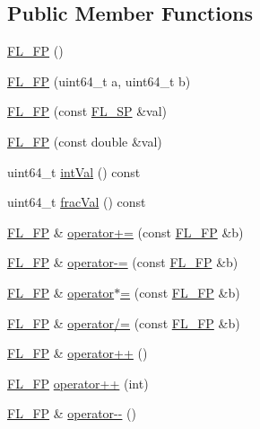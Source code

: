 \subsection*{Public Member Functions}
\begin{DoxyCompactItemize}
\item 
\hyperlink{class_f_l___f_p_a2db44ca3f010e72af1a0ba97f443fe93}{F\+L\+\_\+\+FP} ()
\item 
\hyperlink{class_f_l___f_p_ac233226f5a38c1180b00965cda0b2ba1}{F\+L\+\_\+\+FP} (uint64\+\_\+t a, uint64\+\_\+t b)
\item 
\hyperlink{class_f_l___f_p_ae69dbbbcee3563f7ff4e3102dd137c05}{F\+L\+\_\+\+FP} (const \hyperlink{struct_f_l___s_p}{F\+L\+\_\+\+SP} \&val)
\item 
\hyperlink{class_f_l___f_p_a552b545bb667d5a6436e89f33586e9fa}{F\+L\+\_\+\+FP} (const double \&val)
\item 
uint64\+\_\+t \hyperlink{class_f_l___f_p_acffd4f751e5042dbed4a28bfe3f90ea5}{int\+Val} () const
\item 
uint64\+\_\+t \hyperlink{class_f_l___f_p_adeac9cc0d327d4759ac35890c13978c0}{frac\+Val} () const
\item 
\hyperlink{class_f_l___f_p}{F\+L\+\_\+\+FP} \& \hyperlink{class_f_l___f_p_ab07d8c341752a6668a3a8a6e0d8ba2c7}{operator+=} (const \hyperlink{class_f_l___f_p}{F\+L\+\_\+\+FP} \&b)
\item 
\hyperlink{class_f_l___f_p}{F\+L\+\_\+\+FP} \& \hyperlink{class_f_l___f_p_a494e954f36fbfd791dfc2117e0de4baa}{operator-\/=} (const \hyperlink{class_f_l___f_p}{F\+L\+\_\+\+FP} \&b)
\item 
\hyperlink{class_f_l___f_p}{F\+L\+\_\+\+FP} \& \hyperlink{class_f_l___f_p_a04123cec30a145c37cfdaa2030ecba5e}{operator$\ast$=} (const \hyperlink{class_f_l___f_p}{F\+L\+\_\+\+FP} \&b)
\item 
\hyperlink{class_f_l___f_p}{F\+L\+\_\+\+FP} \& \hyperlink{class_f_l___f_p_a2bbae2b6138642ae4cf90eb7b3a1ea5f}{operator/=} (const \hyperlink{class_f_l___f_p}{F\+L\+\_\+\+FP} \&b)
\item 
\hyperlink{class_f_l___f_p}{F\+L\+\_\+\+FP} \& \hyperlink{class_f_l___f_p_a883f8d6a0d34a3af9a35654b25f0ba7c}{operator++} ()
\item 
\hyperlink{class_f_l___f_p}{F\+L\+\_\+\+FP} \hyperlink{class_f_l___f_p_a2feeebae2b863b1955232473b4f62db0}{operator++} (int)
\item 
\hyperlink{class_f_l___f_p}{F\+L\+\_\+\+FP} \& \hyperlink{class_f_l___f_p_a3e9f6cc369b21fe2d188ebeca60a3df4}{operator-\/-\/} ()
\item 

\end{DoxyCompactItemize}
